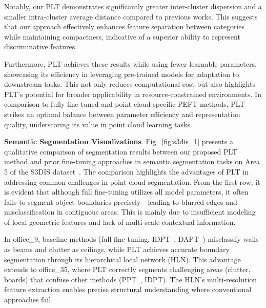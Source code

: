 Notably, our PLT demonstrates significantly greater inter-cluster dispersion and a smaller intra-cluster average distance compared to previous works. This suggests that our approach effectively enhances feature separation between categories while maintaining compactness, indicative of a superior ability to represent discriminative features.

Furthermore, PLT achieves these results while using fewer learnable parameters, showcasing its efficiency in leveraging pre-trained models for adaptation to downstream tasks. This not only reduces computational cost but also highlights PLT's potential for broader applicability in resource-constrained environments. In comparison to fully fine-tuned and point-cloud-specific PEFT methods, PLT strikes an optimal balance between parameter efficiency and representation quality, underscoring its value in point cloud learning tasks.

\textbf{Semantic Segmentation Visualizations}. Fig.~\ref{fig:s3dis_1} presents a qualitative comparison of segmentation results between our proposed PLT method and prior fine-tuning approaches in semantic segmentation tasks on Area 5 of the S3DIS dataset~\cite{armeni20163d}. The comparison highlights the advantages of PLT in addressing common challenges in point cloud segmentation. From the first row, it is evident that although full fine-tuning utilizes all model parameters, it often fails to segment object boundaries precisely—leading to blurred edges and misclassification in contiguous areas. This is mainly due to insufficient modeling of local geometric features and lack of multi-scale contextual information.


In office\_9, baseline methods (full fine-tuning, IDPT~\cite{zha2023instance}, DAPT~\cite{zhou2024dynamic}) misclassify walls as beams and clutter as ceilings, while PLT achieves accurate boundary segmentation through its hierarchical local network (HLN). This advantage extends to office\_35, where PLT correctly segments challenging areas (clutter, boards) that confuse other methods (PPT~\cite{zhang2024positional}, IDPT). The HLN's multi-resolution feature extraction enables precise structural understanding where conventional approaches fail.

